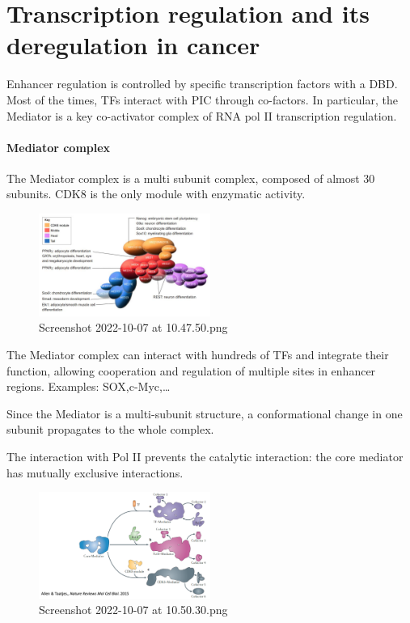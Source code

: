 \graphicspath{{chapters/_resources/}}

\chapter{Transcription regulation and its deregulation in cancer}

Enhancer regulation is controlled by specific transcription factors with a DBD. Most of the times, TFs interact with PIC through co-factors. In particular, the Mediator is a key co-activator complex of RNA pol II transcription regulation.

\hypertarget{mediator-complex}{%
\subsubsection{Mediator complex}\label{mediator-complex}}

The Mediator complex is a multi subunit complex, composed of almost 30 subunits. CDK8 is the only module with enzymatic activity.

\begin{figure}
\centering
\includegraphics[width=0.5\textwidth]{../_resources/Screenshot_2022-10-07_at_10-47-50.png}
\caption{Screenshot 2022-10-07 at 10.47.50.png}
\end{figure}

The Mediator complex can interact with hundreds of TFs and integrate their function, allowing cooperation and regulation of multiple sites in enhancer regions. Examples: SOX,c-Myc,\ldots{}

Since the Mediator is a multi-subunit structure, a conformational change in one subunit propagates to the whole complex.

The interaction with Pol II prevents the catalytic interaction: the core mediator has mutually exclusive interactions.

\begin{figure}
\centering
\includegraphics[width=0.5\textwidth]{../_resources/Screenshot_2022-10-07_at_10-50-30.png}
\caption{Screenshot 2022-10-07 at 10.50.30.png}
\end{figure}

